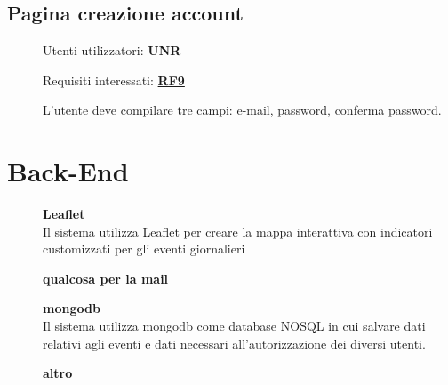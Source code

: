 \documentclass{article}
\begin{document}
\subsection{Pagina creazione account}
\begin{description}
    \item[] Utenti utilizzatori: \textbf{UNR}
    \item[] Requisiti interessati: \hyperref[rf_9]{\textbf{RF9}}
    \item[] L'utente deve compilare tre campi: e-mail, password, conferma password.
\end{description}
\clearpage
\section{Back-End}
\begin{description}
    \item[] \textbf{Leaflet} \\
        Il sistema utilizza Leaflet per creare la mappa interattiva con indicatori customizzati per gli eventi giornalieri
    \item[] \textbf{qualcosa per la mail}
    \item[] \textbf{mongodb} \\
        Il sistema utilizza mongodb come database NOSQL in cui salvare dati relativi agli eventi e dati necessari all'autorizzazione dei diversi utenti.
    \item[] \textbf{altro} \\
\end{description}
\end{document}
